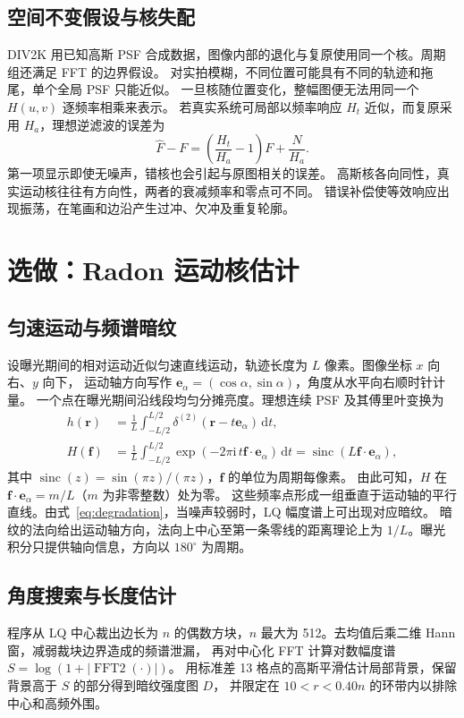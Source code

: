 \documentclass[UTF8,a4paper,zihao=5,fontset=fandol,twoside]{ctexart}
\begin{document}
\subsection{空间不变假设与核失配}
DIV2K 用已知高斯 PSF 合成数据，图像内部的退化与复原使用同一个核。周期组还满足 FFT 的边界假设。
对实拍模糊，不同位置可能具有不同的轨迹和拖尾，单个全局 PSF 只能近似。
一旦核随位置变化，整幅图便无法用同一个 \(H(u,v)\) 逐频率相乘来表示。
若真实系统可局部以频率响应 \(H_t\) 近似，而复原采用 \(H_a\)，理想逆滤波的误差为
\begin{equation}
\widehat F-F=\left(\frac{H_t}{H_a}-1\right)F+\frac{N}{H_a}.
\end{equation}
第一项显示即使无噪声，错核也会引起与原图相关的误差。
高斯核各向同性，真实运动核往往有方向性，两者的衰减频率和零点可不同。
错误补偿使等效响应出现振荡，在笔画和边沿产生过冲、欠冲及重复轮廓。


\FloatBarrier

\section{选做：Radon 运动核估计}
\subsection{匀速运动与频谱暗纹}
设曝光期间的相对运动近似匀速直线运动，轨迹长度为 \(L\) 像素。图像坐标 \(x\) 向右、\(y\) 向下，
运动轴方向写作 \(\boldsymbol e_\alpha=(\cos\alpha,\sin\alpha)\)，角度从水平向右顺时针计量。
一个点在曝光期间沿线段均匀分摊亮度。理想连续 PSF 及其傅里叶变换为
\begin{align}
h(\boldsymbol r)&=\frac1L\int_{-L/2}^{L/2}
  \delta^{(2)}(\boldsymbol r-t\boldsymbol e_\alpha)\,\mathrm dt,\\
H(\boldsymbol f)&=\frac1L\int_{-L/2}^{L/2}
  \exp(-2\pi\mathrm i\,t\boldsymbol f\cdot\boldsymbol e_\alpha)\,\mathrm dt
  =\operatorname{sinc}(L\boldsymbol f\cdot\boldsymbol e_\alpha),
\end{align}
其中 \(\operatorname{sinc}(z)=\sin(\pi z)/(\pi z)\)，\(\boldsymbol f\) 的单位为周期每像素。
由此可知，\(H\) 在 \(\boldsymbol f\cdot\boldsymbol e_\alpha=m/L\)（\(m\) 为非零整数）处为零。
这些频率点形成一组垂直于运动轴的平行直线。由式~\eqref{eq:degradation}，当噪声较弱时，LQ 幅度谱上可出现对应暗纹。
暗纹的法向给出运动轴方向，法向上中心至第一条零线的距离理论上为 \(1/L\)。曝光积分只提供轴向信息，方向以 \(180^\circ\) 为周期。

\subsection{角度搜索与长度估计}
程序从 LQ 中心裁出边长为 \(n\) 的偶数方块，\(n\) 最大为 512。去均值后乘二维 Hann 窗，减弱裁块边界造成的频谱泄漏，
再对中心化 FFT 计算对数幅度谱 \(S=\log(1+|\operatorname{FFT2}(\cdot)|)\)。
用标准差 13 格点的高斯平滑估计局部背景，保留背景高于 \(S\) 的部分得到暗纹强度图 \(D\)，
并限定在 \(10<r<0.40n\) 的环带内以排除中心和高频外围。
\end{document}
